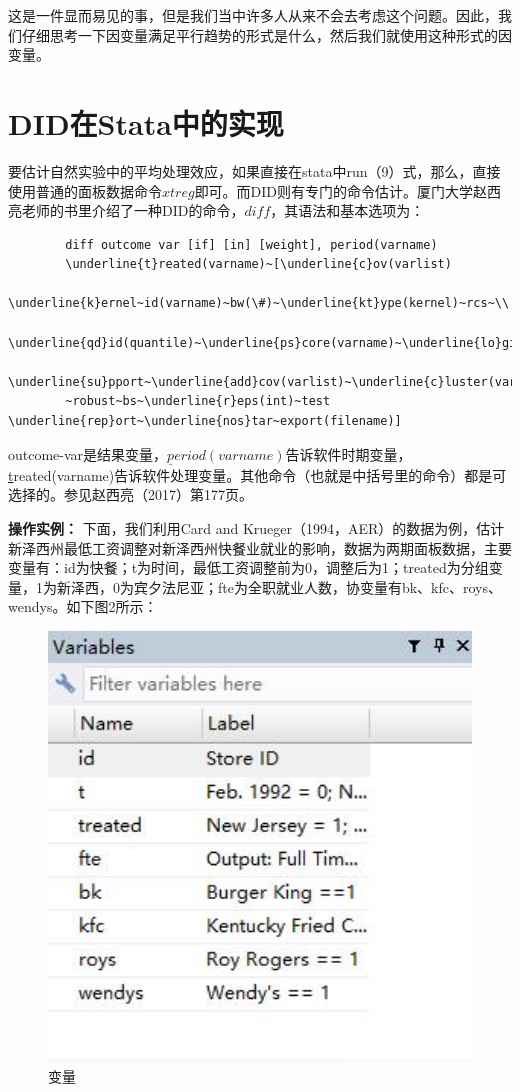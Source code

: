 \documentclass[cn,12pt,math=newtx,citestyle=gb7714-2015,bibstyle=gb7714-2015]{elegantbook}
\begin{document}
	这是一件显而易见的事，但是我们当中许多人从来不会去考虑这个问题。因此，我们仔细思考一下因变量满足平行趋势的形式是什么，然后我们就使用这种形式的因变量。
	
	\section{DID在Stata中的实现}
	
	要估计自然实验中的平均处理效应，如果直接在stata中run（9）式，那么，直接使用普通的面板数据命令$xtreg$即可。而DID则有专门的命令估计。厦门大学赵西亮老师的书里介绍了一种DID的命令，$diff$，其语法和基本选项为：
	\begin{lstlisting}
		diff outcome var [if] [in] [weight], period(varname)
		\underline{t}reated(varname)~[\underline{c}ov(varlist)
		\underline{k}ernel~id(varname)~bw(\#)~\underline{kt}ype(kernel)~rcs~\\
		\underline{qd}id(quantile)~\underline{ps}core(varname)~\underline{lo}git~\\
		\underline{su}pport~\underline{add}cov(varlist)~\underline{c}luster(varname)\\
		~robust~bs~\underline{r}eps(int)~test \underline{rep}ort~\underline{nos}tar~export(filename)]
	\end{lstlisting}
	
	outcome-var是结果变量，$\underline{p}eriod(varname)$告诉软件时期变量，\underline{t}reated(varname)告诉软件处理变量。其他命令（也就是中括号里的命令）都是可选择的。参见赵西亮（2017）第177页。
	
	\textbf{操作实例：}
	下面，我们利用Card and Krueger（1994，AER）的数据为例，估计新泽西州最低工资调整对新泽西州快餐业就业的影响，数据为两期面板数据，主要变量有：id为快餐；t为时间，最低工资调整前为0，调整后为1；treated为分组变量，1为新泽西，0为宾夕法尼亚；fte为全职就业人数，协变量有bk、kfc、roys、wendys。如下图2所示：
	\begin{figure}[htbp!]
		\centering
		\includegraphics[width=1\textwidth]{var.jpg}
		\caption{变量}\label{fig:digit}
	\end{figure}
	
\end{document}
